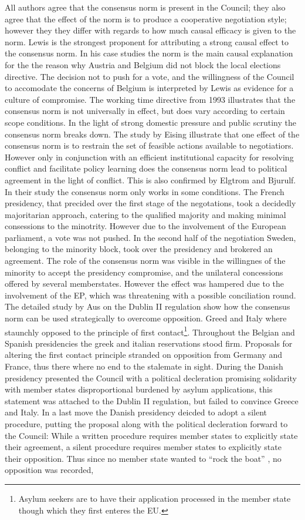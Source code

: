 All authors agree that the consensus norm is present in the Council; they also agree that the effect of the norm is to produce a cooperative negotiation style; however they they differ with regards to how much causal efficacy is given to the norm. Lewis is the strongest proponent for attributing a strong causal effect to the consensus norm. In his case studies the norm is the main causal explanation for the the reason why Austria and Belgium did not block the local elections directive. The decision not to push for a vote, and the willingness of the Council to accomodate the concerns of Belgium is interpreted by Lewis as evidence for a culture of compromise. The working time directive from 1993 illustrates that the consensus norm is not universally in effect, but does vary according to certain scope conditions. In the light of strong domestic pressure and public scrutiny the consensus norm breaks down. The study by Eising illustrate that one effect of the consensus norm is to restrain the set of feasible actions available to negotiatiors. However only in conjunction with an efficient institutional capacity for resolving conflict and facilitate policy learning does the consensus norm lead to political agreement in the light of conflict. This is also confirmed by Elgtrom and Bjurulf. In their study the consensus norm only works in some conditions. The French presidency, that precided over the first stage of the negotations, took a decidedly majoritarian approach, catering to the qualified majority and making minimal consessions to the minotrity. However due to the involvement of the European parliament, a vote was not pushed. In the second half of the negotiation Sweden, belonging to the minority block, took over the presidency and brokered an agreement. The role of the consensus norm was visible in the willingnes of the minority to accept the presidency compromise, and the unilateral concessions offered by several memberstates. However the effect was hampered due to the involvement of the EP, which was threatening with a possible conciliation round. The detailed study by Aus on the Dublin II regulation show how the consensus norm can be used strategically to overcome opposition. Greed and Italy where staunchly opposed to the principle of first contact\footnote{Asylum seekers are to have their application processed in the member state though which they first enteres the EU.}. Throughout the Belgian and Spanish presidencies the greek and italian reservations stood firm. Proposals for altering the first contact principle stranded on opposition from Germany and France, thus there where no end to the stalemate in sight. During the Danish presidency presented the Council with a political decleration promising solidarity with member states disproportional burdened by asylum applications, this statement was attached to the Dublin II regulation, but failed to convince Greece and Italy. In a last move the Danish presidency deicded to adopt a silent procedure, putting the proposal along with the political decleration forward to the Council: While a written procedure requires member states to explicitly state their agreement, a silent procedure requires member states to explicitly state their opposition. Thus since no member state wanted to ``rock the boat'' , no opposition was recorded, 